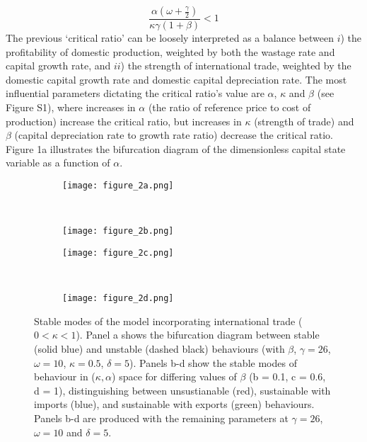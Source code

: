 \documentclass[12pt]{article}
\begin{document}
\begin{equation}
  \frac{ \alpha (\omega + \frac{\gamma}{2})}{\kappa \gamma(1+\beta)} < 1
\end{equation}
%
The previous `critical ratio' can be loosely interpreted as a balance between $i$) the profitability of domestic production, weighted by both the wastage rate and capital growth rate, and $ii$) the strength of international trade, weighted by the domestic capital growth rate and domestic capital depreciation rate. The most influential parameters dictating the critical ratio's value are $\alpha$, $\kappa$ and $\beta$ (see Figure S1), where increases in $\alpha$ (the ratio of reference price to cost of production) increase the critical ratio, but increases in $\kappa$ (strength of trade) and $\beta$ (capital depreciation rate to growth rate ratio) decrease the critical ratio. Figure 1a illustrates the bifurcation diagram of the dimensionless capital state variable as a function of $\alpha$.

\begin{figure}[t!]
  \begin{subfigure}{0.5\textwidth}
      \texttt{[image: figure\_2a.png]}
  \end{subfigure}%
  ~%
  \begin{subfigure}{0.5\textwidth}
      \texttt{[image: figure\_2b.png]}
  \end{subfigure}

  \begin{subfigure}{0.5\textwidth}
      \texttt{[image: figure\_2c.png]}
  \end{subfigure}%
  ~%
  \begin{subfigure}{0.5\textwidth}
      \texttt{[image: figure\_2d.png]}
  \end{subfigure}%

  \caption{Stable modes of the model incorporating international trade ($0 < \kappa < 1$). Panel a shows the bifurcation diagram between stable (solid blue) and unstable (dashed black) behaviours (with $\beta$, $\gamma = 26$, $\omega = 10$, $\kappa = 0.5$, $\delta = 5$). Panels b-d show the stable modes of behaviour in ($\kappa, \alpha$) space for differing values of $\beta$ (b = 0.1, c = 0.6, d = 1), distinguishing between unsustianable (red), sustainable with imports (blue), and sustainable with exports (green) behaviours. Panels b-d are produced with the remaining parameters at $\gamma = 26$, $\omega = 10$ and $\delta = 5$.}
  \label{figure2}
\end{figure}
\end{document}
